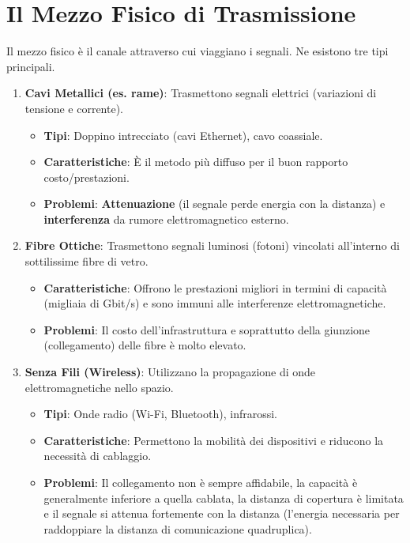 \section{Il Mezzo Fisico di Trasmissione}

Il mezzo fisico è il canale attraverso cui viaggiano i segnali. Ne esistono tre tipi principali.
\begin{enumerate}
    \item \textbf{Cavi Metallici (es. rame)}: Trasmettono segnali elettrici (variazioni di tensione e corrente).
    \begin{itemize}
        \item \textbf{Tipi}: Doppino intrecciato (cavi Ethernet), cavo coassiale.
        \item \textbf{Caratteristiche}: È il metodo più diffuso per il buon rapporto costo/prestazioni.
        \item \textbf{Problemi}: \textbf{Attenuazione} (il segnale perde energia con la distanza) e \textbf{interferenza} da rumore elettromagnetico esterno.
    \end{itemize}
    \item \textbf{Fibre Ottiche}: Trasmettono segnali luminosi (fotoni) vincolati all'interno di sottilissime fibre di vetro.
    \begin{itemize}
        \item \textbf{Caratteristiche}: Offrono le prestazioni migliori in termini di capacità (migliaia di Gbit/s) e sono immuni alle interferenze elettromagnetiche.
        \item \textbf{Problemi}: Il costo dell'infrastruttura e soprattutto della giunzione (collegamento) delle fibre è molto elevato.
    \end{itemize}
    \item \textbf{Senza Fili (Wireless)}: Utilizzano la propagazione di onde elettromagnetiche nello spazio.
    \begin{itemize}
        \item \textbf{Tipi}: Onde radio (Wi-Fi, Bluetooth), infrarossi.
        \item \textbf{Caratteristiche}: Permettono la mobilità dei dispositivi e riducono la necessità di cablaggio.
        \item \textbf{Problemi}: Il collegamento non è sempre affidabile, la capacità è generalmente inferiore a quella cablata, la distanza di copertura è limitata e il segnale si attenua fortemente con la distanza (l'energia necessaria per raddoppiare la distanza di comunicazione quadruplica).
    \end{itemize}
\end{enumerate}

